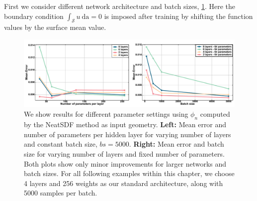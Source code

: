 \documentclass[12pt,openany]{book}
\def\S{\mathcal{S}}
\theoremstyle{plainnormal}
\theoremstyle{remark}
\begin{document}
First we consider different network architecture and batch sizes, \cref{poisson_diff_bs}. Here the boundary condition $\int_\S u\ \mathrm{da} = 0$ is imposed after training by shifting the function values by the surface mean value. \par %
 \begin{figure}
    \centering
    \includegraphics[width=\textwidth]{Figures/pot_combined2.pdf}
    
    \caption{We show results for different parameter settings using $\phi_n$ computed by the NeatSDF method as input geometry. \textbf{Left:} Mean error and number of parameters per hidden layer for varying number of layers and constant batch size, $bs = 5000$. 
     \textbf{Right:} Mean error and batch size for varying number of layers and fixed number of parameters. Both plots show only minor improvements for larger networks and batch sizes. For all following examples within this chapter, we choose 4 layers and 256 weights as our standard architecture, along with 5000 samples per batch.}
    \label{poisson_diff_bs}
    \end{figure}
 
\end{document}
